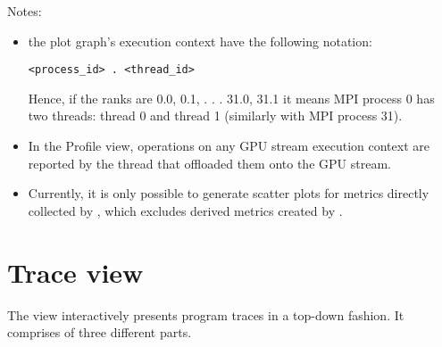 \documentclass[english]{article}
\begin{document}
Notes:
\begin{itemize}
	\item the plot graph’s execution context have the following notation:
\begin{verbatim}
<process_id> . <thread_id>
\end{verbatim}
	Hence, if the ranks are 0.0, 0.1, . . . 31.0, 31.1 it means MPI process 0 has two threads:
thread 0 and thread 1 (similarly with MPI process 31).
	\item In the Profile view, operations on any GPU stream execution context are reported by the thread that offloaded them onto the GPU stream.
	\item Currently, it is only possible to generate scatter plots for metrics directly collected by
, which excludes derived metrics created by .
\end{itemize}




\section{Trace view}

The view interactively presents program traces in a top-down fashion.
It comprises of three different parts.
\end{document}
